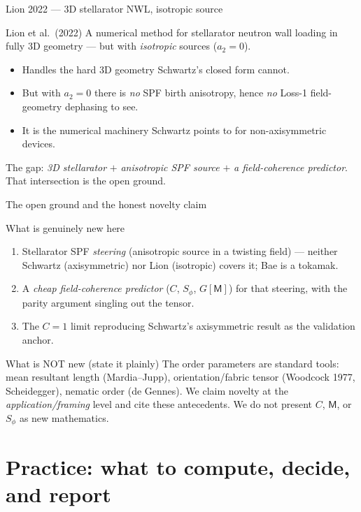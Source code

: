 \documentclass[aspectratio=169]{beamer}
\newcommand{\M}{\mathsf M}
\newcommand{\Sphi}{S_\phi}
\begin{document}
\begin{frame}[t]{Lion 2022 --- 3D stellarator NWL, isotropic source}
\begin{block}{Lion et al.\ (2022)}
A numerical method for stellarator neutron wall loading in fully 3D geometry --- but with \emph{isotropic} sources ($a_2=0$).
\end{block}
\begin{itemize}
  \item Handles the hard 3D geometry Schwartz's closed form cannot.
  \item But with $a_2=0$ there is \emph{no} SPF birth anisotropy, hence \emph{no} Loss-1 field-geometry dephasing to see.
  \item It is the numerical machinery Schwartz points to for non-axisymmetric devices.
\end{itemize}
The gap: \emph{3D stellarator} $+$ \emph{anisotropic SPF source} $+$ \emph{a field-coherence predictor}. That intersection is the open ground.
\end{frame}

\begin{frame}[t]{The open ground and the honest novelty claim}
\begin{block}{What is genuinely new here}
\begin{enumerate}
  \item Stellarator SPF \emph{steering} (anisotropic source in a twisting field) --- neither Schwartz (axisymmetric) nor Lion (isotropic) covers it; Bae is a tokamak.
  \item A \emph{cheap field-coherence predictor} ($C$, $\Sphi$, $G[\M]$) for that steering, with the parity argument singling out the tensor.
  \item The $C=1$ limit reproducing Schwartz's axisymmetric result as the validation anchor.
\end{enumerate}
\end{block}
\begin{block}{What is NOT new (state it plainly)}
The order parameters are standard tools: mean resultant length (Mardia--Jupp), orientation/fabric tensor (Woodcock 1977, Scheidegger), nematic order (de Gennes). We claim novelty at the \emph{application/framing} level and cite these antecedents. We do not present $C$, $\M$, or $\Sphi$ as new mathematics.
\end{block}
\end{frame}

\section{Practice: what to compute, decide, and report}
\end{document}
